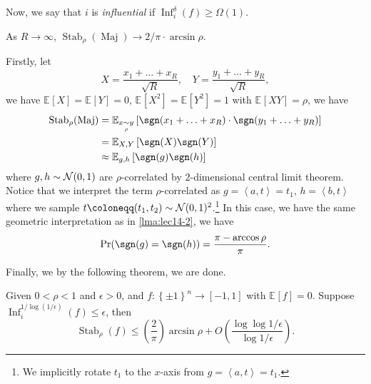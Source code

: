 Now, we say that \(i\) is \emph{influential} if \(\mathop{\mathrm{Inf}}_i^\delta (f) \geq \Omega (1).\)

\begin{claim}
	As \(R \to \infty \), \(\mathop{\mathrm{Stab}}_\rho (\mathop{\mathrm{Maj}}) \to 2 / \pi \cdot \arcsin \rho\).
\end{claim}
\begin{explanation}
	Firstly, let
	\[
		X = \frac{x_1 + \ldots  + x_R}{\sqrt{R} },\quad
		Y = \frac{y_1 + \ldots  + y_R}{\sqrt{R} },
	\]
	we have \(\mathbb{E}_{}\left[X \right] = \mathbb{E}_{}\left[Y \right] = 0\), \(\mathbb{E}_{}\left[X^2 \right] = \mathbb{E}_{}\left[Y^2 \right] = 1\) with \(\mathbb{E}_{}\left[XY \right] = \rho \), we have
	\[
		\begin{split}
			\mathop{\mathrm{Stab}}\nolimits_\rho (\mathop{\mathrm{Maj}})
			&= \mathbb{E}_{x \underset{\rho }{\sim } y}\left[ \sgn (x_1 + \ldots + x_R ) \cdot \sgn (y_1 + \ldots +y_R )\right]\\
			&= \mathbb{E}_{X, Y}\left[\sgn (X) \sgn (Y) \right]\\
			&\approx \mathbb{E}_{g, h}\left[\sgn (g)\sgn (h) \right]
		\end{split}
	\]
	where \(g, h \sim \mathcal{\MakeUppercase{n}} (0, 1)\) are \(\rho \)-correlated by \(2\)-dimensional central limit theorem. Notice that we interpret the term \(\rho \)-correlated as \(g=\left\langle a, t \right\rangle = t_1\), \(h=\left\langle b, t \right\rangle \) where we sample \(t \coloneqq (t_1, t_2)\sim \mathcal{\MakeUppercase{n}} (0, 1)^2\).\footnote{We implicitly rotate \(t_1\) to the \(x\)-axis from \(g=\left\langle a, t \right\rangle = t_1\).} In this case, we have the same geometric interpretation as in \autoref{lma:lec14-2}, we have
	\[
		\Pr_{}(\sgn (g) = \sgn (h)) = \frac{\pi - \arccos \rho }{\pi }.
	\]
\end{explanation}

Finally, we by the following theorem, we are done.

\begin{theorem}\label{thm:MIST}
	Given \(0 < \rho < 1\) and \(\epsilon > 0\), and \(f\colon \left\{ \pm 1 \right\} ^n \to [-1, 1]\) with \(\mathbb{E}_{}\left[f \right] = 0\). Suppose \(\mathop{\mathrm{Inf}}_i^{1 / \log (1 / \epsilon )}(f)\leq \epsilon \), then
	\[
		\mathop{\mathrm{Stab}}\nolimits_\rho (f) \leq \left( \frac{2}{\pi } \right) \arcsin \rho + O\left( \frac{\log \log 1 / \epsilon }{\log 1 / \epsilon } \right).
	\]
\end{theorem}